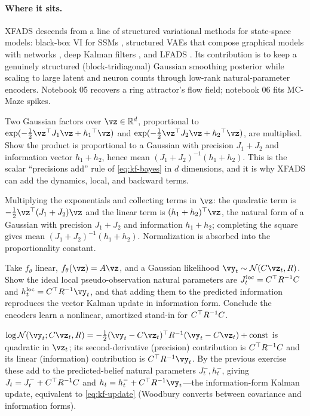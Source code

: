 \documentclass[11pt]{article}
\theoremstyle{plain}
\theoremstyle{definition}
\theoremstyle{remark}
\theoremstyle{definition}
\newcommand{\Normal}{\mathcal{N}}
\begin{document}
\paragraph{Where it sits.} XFADS descends from a line of structured
variational methods for state-space models: black-box VI for SSMs
\parencite{Archer2015-bbvi}, structured VAEs that compose graphical models with
networks \parencite{Johnson2016-svae}, deep Kalman filters
\parencite{Krishnan2017-dkf}, and LFADS \parencite{Pandarinath2018-lfads}. Its
contribution is to keep a genuinely structured (block-tridiagonal) Gaussian
smoothing posterior while scaling to large latent and neuron counts through
low-rank natural-parameter encoders. Notebook 05 recovers a ring attractor's flow
field; notebook 06 fits MC-Maze spikes.

\begin{exercise}
Two Gaussian factors over $\vz\in\reals^d$, proportional to $\exp(-\tfrac12
\vz\trp J_1\vz + h_1\trp\vz)$ and $\exp(-\tfrac12\vz\trp J_2\vz + h_2\trp\vz)$, are
multiplied. Show the product is proportional to a Gaussian with precision $J_1 +
J_2$ and information vector $h_1 + h_2$, hence mean $(J_1 + J_2)^{-1}(h_1 + h_2)$.
This is the scalar ``precisions add'' rule of \eqref{eq:kf-bayes} in $d$
dimensions, and it is why XFADS can add the dynamics, local, and backward terms.
\end{exercise}
\begin{solution}
Multiplying the exponentials and collecting terms in $\vz$: the quadratic term is
$-\tfrac12\vz\trp(J_1 + J_2)\vz$ and the linear term is $(h_1 + h_2)\trp\vz$, the
natural form of a Gaussian with precision $J_1 + J_2$ and information $h_1 + h_2$;
completing the square gives mean $(J_1 + J_2)^{-1}(h_1 + h_2)$. Normalization is
absorbed into the proportionality constant.
\end{solution}

\begin{exercise}
Take $f_{\theta}$ linear, $f_{\theta}(\vz) = A\vz$, and a Gaussian likelihood
$\vy_t\sim\Normal(C\vz_t, R)$. Show the ideal local pseudo-observation natural
parameters are $J_t^{\mathrm{loc}} = C{^\top} R^{-1} C$ and $h_t^{\mathrm{loc}} =
C\trp R^{-1}\vy_t$, and that adding them to the predicted information reproduces
the vector Kalman update in information form. Conclude the encoders learn a
nonlinear, amortized stand-in for $C{^\top} R^{-1} C$.
\end{exercise}
\begin{solution}
$\log\Normal(\vy_t; C\vz_t, R) = -\tfrac12(\vy_t - C\vz_t)\trp R^{-1}(\vy_t -
C\vz_t) + \mathrm{const}$ is quadratic in $\vz_t$; its second-derivative
(precision) contribution is $C{^\top} R^{-1} C$ and its linear (information)
contribution is $C\trp R^{-1}\vy_t$. By the previous exercise these add to the
predicted-belief natural parameters $J_t^-, h_t^-$, giving $J_t = J_t^- + C{^\top}
R^{-1} C$ and $h_t = h_t^- + C\trp R^{-1}\vy_t$---the information-form Kalman
update, equivalent to \eqref{eq:kf-update} (Woodbury converts between covariance
and information forms).
\end{solution}
\end{document}
